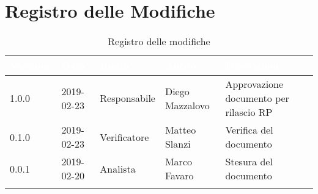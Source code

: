 \newpage

\section*{Registro delle Modifiche}

\begin{center}
\begin{longtable}[c]{|m{}|m{}|m{}|m{}|p{}|}
\hline
\rowcolor{bluelogo}\textbf{\textcolor{white}{Versione}} & \textbf{\textcolor{white}{Data}} & \textbf{\textcolor{white}{Ruolo}} & \textbf{\textcolor{white}{Autore}} & \textbf{\textcolor{white}{Descrizione}}\\
\hline 
\endfirsthead
1.0.0 & 2019-02-23 & Responsabile & Diego Mazzalovo & Approvazione documento per rilascio RP\\
\hline
\rowcolor{grigio} 0.1.0 & 2019-02-23 & Verificatore & Matteo Slanzi & Verifica del documento \\
\hline
0.0.1 & 2019-02-20 & Analista & Marco Favaro & Stesura del documento \\
\hline
\caption{Registro delle modifiche}
\end{longtable}
\end{center}

